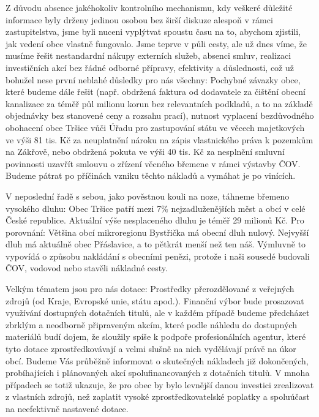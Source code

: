 \documentclass{article}
\begin{document}
\begin{multicols}{2}
{Z důvodu absence jakéhokoliv kontrolního mechanismu, kdy veškeré důležité informace byly drženy jedinou osobou bez širší diskuze alespoň v rámci zastupitelstva, jsme byli nuceni vyplýtvat spoustu času na to, abychom zjistili, jak vedení obce vlastně fungovalo. Jsme teprve v půli cesty, ale už dnes víme, že musíme řešit nestandardní nákupy externích služeb, absenci smluv, realizaci investičních akcí bez řádné odborné přípravy, efektivity a důslednosti, což už bohužel nese první neblahé důsledky pro nás všechny: Pochybné závazky obce, které budeme dále řešit (např. obdržená faktura od dodavatele za čištění obecní kanalizace za téměř půl milionu korun bez relevantních podkladů, a to na základě objednávky bez stanovené ceny a rozsahu prací), nutnost vyplacení bezdůvodného obohacení obce Tršice vůči Úřadu pro zastupování státu ve věcech majetkových ve výši 81 tis. Kč za neuplatnění nároku na zápis vlastnického práva k pozemkům na Zákřově, nebo obdržená pokuta ve výši 40 tis. Kč za nesplnění smluvní povinnosti uzavřít smlouvu o zřízení věcného břemene v rámci výstavby ČOV. Budeme pátrat po příčinách vzniku těchto nákladů a vymáhat je po vinících.

V neposlední řadě s sebou, jako pověstnou kouli na noze, táhneme břemeno vysokého dluhu: Obec Tršice patří mezi 7\% nejzadluženějších měst a obcí v celé České republice. Aktuální výše nesplaceného dluhu je téměř 29 milionů Kč. Pro porovnání: Většina obcí mikroregionu Bystřička má obecní dluh nulový. Nejvyšší dluh má aktuálně obec Přáslavice, a to pětkrát menší než ten náš. Výmluvně to vypovídá o způsobu nakládání s obecními penězi, protože i naši sousedé budovali ČOV, vodovod nebo stavěli nákladné cesty.

Velkým tématem jsou pro nás dotace: Prostředky přerozdělované z veřejných zdrojů (od Kraje, Evropské unie, státu apod.). Finanční výbor bude prosazovat využívání dostupných dotačních titulů, ale v každém případě budeme předcházet zbrklým a neodborně připraveným akcím, které podle náhledu do dostupných materiálů budí dojem, že sloužily spíše k podpoře profesionálních agentur, které tyto dotace zprostředkovávají a velmi slušně na nich vydělávají právě na úkor obcí. Budeme Vás průběžně informovat o skutečných nákladech již dokončených, probíhajících i plánovaných akcí spolufinancovaných z dotačních titulů. V mnoha případech se totiž ukazuje, že pro obec by bylo levnější danou investici zrealizovat z vlastních zdrojů, než zaplatit vysoké zprostředkovatelské poplatky a spoluúčast na neefektivně nastavené dotace.

}
\end{multicols}
\end{document}
